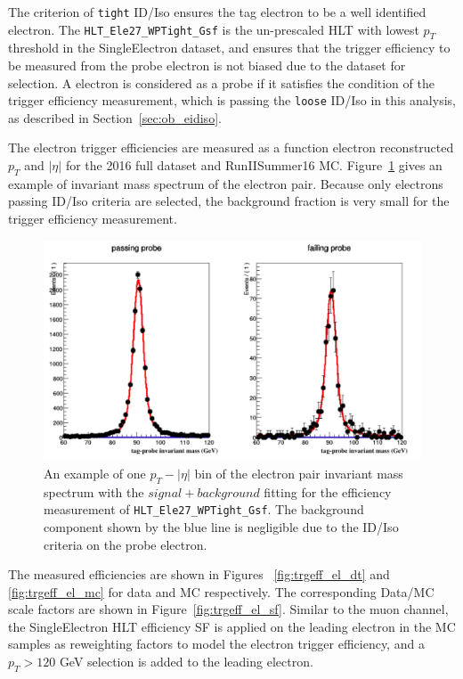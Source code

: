 The criterion of \texttt{tight} ID/Iso ensures the tag electron to be a well identified electron. The \texttt{HLT\_Ele27\_WPTight\_Gsf} is the un-prescaled HLT with lowest $p_T$ threshold in the SingleElectron dataset, and ensures that the trigger efficiency to be measured from the probe electron is not biased due to the dataset for selection. A electron is considered as a probe if it satisfies the condition of the trigger efficiency measurement, which is passing the \texttt{loose} ID/Iso in this analysis, as described in Section~\ref{sec:ob_eidiso}.

\vspace{0.3cm}
The electron trigger efficiencies are measured as a function electron reconstructed $p_T$ and $|\eta|$ for the 2016 full dataset and RunIISummer16 MC. Figure~\ref{fig:bg_etrgtnp} gives an example of invariant mass spectrum of the electron pair. Because only electrons passing ID/Iso criteria are selected, the background fraction is very small for the trigger efficiency measurement.

\begin{figure}[htpb]
\begin{center}
\includegraphics[width=0.95\linewidth, page=1]{figures/bg_etrgtnp.png}
\caption{An example of one  $p_T - |\eta|$ bin of the electron pair invariant mass spectrum with the $signal+background$ fitting for the efficiency measurement of \texttt{HLT\_Ele27\_WPTight\_Gsf}. The background component shown by the blue line is negligible due to the ID/Iso criteria on the probe electron.}
\label{fig:bg_etrgtnp}
\end{center}
\end{figure}

\vspace{0.3cm}
The measured efficiencies are shown in Figures ~\ref{fig:trgeff_el_dt} and \ref{fig:trgeff_el_mc} for data and MC respectively. The corresponding Data/MC scale factors are shown in Figure~\ref{fig:trgeff_el_sf}. Similar to the muon channel, the SingleElectron HLT efficiency SF is applied on the leading electron in the MC samples as reweighting factors to model the electron trigger efficiency, and a $p_T > 120$ GeV selection is added to the leading electron.

